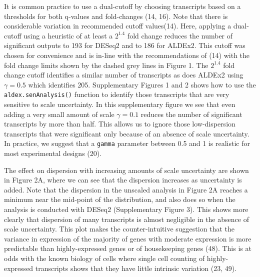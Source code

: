 \documentclass[
]{article}
\begin{document}
It is common practice to use a dual-cutoff by choosing transcripts based
on a thresholds for both q-values and fold-changes (14, 16). Note that
there is considerable variation in recommended cutoff values(14). Here,
applying a dual-cutoff using a heuristic of at least a \(2^{1.4}\) fold
change reduces the number of significant outputs to 193 for DESeq2 and
to 186 for ALDEx2. This cutoff was chosen for convenience and is in-line
with the recommendations of (14) with the fold change limits shown by
the dashed grey lines in Figure 1. The \(2^{1.4}\) fold change cutoff
identifies a similar number of transcripts as does ALDEx2 using
\(\gamma = 0.5\) which identifies 205. Supplementary Figures 1 and 2
shows how to use the \texttt{aldex.senAnalysis()} function to identify
those transcripts that are very sensitive to scale uncertainty. In this
supplementary figure we see that even adding a very small amount of
scale \(\gamma = 0.1\) reduces the number of significant transcripts by
more than half. This allows us to ignore those low-dispersion
transcripts that were significant only because of an absence of scale
uncertainty. In practice, we suggest that a \texttt{gamma} parameter
between 0.5 and 1 is realistic for most experimental designs (20).

The effect on dispersion with increasing amounts of scale uncertainty
are shown in Figure 2A, where we can see that the dispersion increases
as uncertainty is added. Note that the dispersion in the unscaled
analysis in Figure 2A reaches a minimum near the mid-point of the
distribution, and also does so when the analysis is conducted with
DESeq2 (Supplementary Figure 3). This shows more clearly that dispersion
of many transcripts is almost negligible in the absence of scale
uncertainty. This plot makes the counter-intuitive suggestion that the
variance in expression of the majority of genes with moderate expression
is more predictable than highly-expressed genes or of housekeeping genes
(48). This is at odds with the known biology of cells where single cell
counting of highly-expressed transcripts shows that they have little
intrinsic variation (23, 49).
\end{document}

